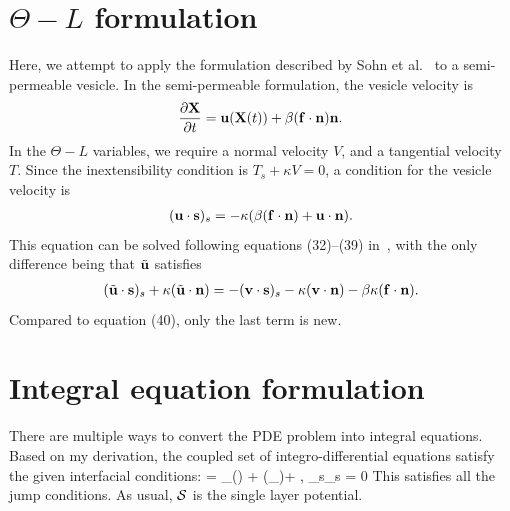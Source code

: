 \documentclass[aps,prl,showpacs]{revtex4}
\begin{document}
\section{{$\Theta-L$} formulation}
Here, we attempt to apply the formulation described by Sohn et
al.~\cite{soh-tse-li-voi-low2010} to a semi-permeable vesicle.  In the
semi-permeable formulation, the vesicle velocity is
\begin{align}
  \frac{\partial \mathbf{X}}{\partial t} = \mathbf{u}(\mathbf{X}(t)) + \beta (\mathbf{f} \cdot \mathbf{n}) \mathbf{n}.
\end{align}
In the {$\Theta-L$} variables, we require a normal velocity $V$, and a
tangential velocity $T$. Since the inextensibility condition is $T_s +
\kappa V = 0$, a condition for the vesicle velocity is
\begin{align}
  (\mathbf{u} \cdot \mathbf{s})_s = -\kappa(\beta (\mathbf{f} \cdot \mathbf{n}) + 
      \mathbf{u} \cdot \mathbf{n}).
\end{align}
This equation can be solved following equations (32)--(39)
in~\cite{soh-tse-li-voi-low2010}, with the only difference being that
$\tilde{\mathbf{u}}$ satisfies
\begin{align}
  (\tilde{\mathbf{u}} \cdot \mathbf{s})_s + \kappa(\tilde{\mathbf{u}} \cdot \mathbf{n}) =
    -(\mathbf{v} \cdot \mathbf{s})_s - \kappa(\mathbf{v} \cdot \mathbf{n}) 
    - \beta\kappa(\mathbf{f} \cdot \mathbf{n}).
\end{align}
Compared to equation (40), only the last term is new.


\section{Integral equation formulation}
There are multiple ways to convert the PDE problem into integral
equations. Based on my derivation, the coupled set of
integro-differential equations satisfy the given interfacial conditions:
\beq 
  \dot{\mbx} = \mbu_\infty(\mbx) + \beta (\mbf_\cdot\mbn)\mbn + , 
  \label{eqn:vesVelocity}
\eeq
\beq 
  \mbx_s\cdot\dot{\mbx}_s = 0 
\eeq
This satisfies all the jump conditions. As usual, $\mathcal{S}$ is the single layer potential. 
\end{document}
